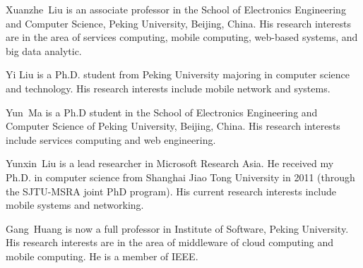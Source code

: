 \begin{IEEEbiography}{Xuanzhe~Liu}
is an associate professor in the School of Electronics Engineering
and Computer Science, Peking University, Beijing, China. His research interests
are in the area of services computing, mobile computing, web-based systems, and big data analytic.
\end{IEEEbiography}

\begin{IEEEbiography}{Yi Liu} is a Ph.D. student from Peking University majoring in computer science and technology. His research interests include mobile network and systems.
\end{IEEEbiography}

\begin{IEEEbiography}{Yun~Ma}
is a Ph.D student in the School of Electronics Engineering
and Computer Science of Peking University, Beijing, China.  His research interests include services computing and web engineering.
\end{IEEEbiography}
\begin{IEEEbiography}{Yunxin~Liu} is a lead researcher in Microsoft Research Asia. He received my Ph.D. in computer science from Shanghai Jiao Tong University in 2011 (through the SJTU-MSRA joint PhD program). His current research interests include mobile systems and networking.
\end{IEEEbiography}

\begin{IEEEbiography}{Gang~Huang} is now
a full professor in Institute of Software, Peking University.
His research interests are in the area of middleware of cloud computing and mobile computing. He is a member of IEEE.
\end{IEEEbiography}


